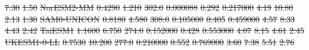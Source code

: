 \documentclass[gmd, manuscript]{copernicus}
\providecommand{\DIFdel}[1]{{\protect\color{red}\sout{#1}}}                      %
\providecommand{\DIFdelFL}[1]{\DIFdel{#1}} %
\providecommand{\DIFaddbeginFL}{} %
\providecommand{\DIFaddendFL}{} %
\providecommand{\DIFdelbeginFL}{} %
\providecommand{\DIFdelendFL}{} %
\begin{document}
\begin{table}[t]
{\DIFdelFL{7.30 }%
\DIFdelFL{1.50 }%
\DIFdelFL{NorESM2-MM      }%
\DIFdelFL{0.4290 }%
\DIFdelFL{1.210 }%
\DIFdelFL{302.0 }%
\DIFdelFL{0.000088 }%
\DIFdelFL{0.292 }%
\DIFdelFL{0.217000 }%
\DIFdelFL{4.19 }%
\DIFdelFL{10.80 }%
\DIFdelFL{2.13 }%
\DIFdelFL{1.30 }%
\DIFdelFL{SAM0-UNICON     }%
\DIFdelFL{0.8180 }%
\DIFdelFL{4.580 }%
\DIFdelFL{308.0 }%
\DIFdelFL{0.105000 }%
\DIFdelFL{0.405 }%
\DIFdelFL{0.459000 }%
\DIFdelFL{4.57 }%
\DIFdelFL{8.33 }%
\DIFdelFL{4.43 }%
\DIFdelFL{2.42 }%
\DIFdelFL{TaiESM1         }%
\DIFdelFL{1.1600 }%
\DIFdelFL{6.750 }%
\DIFdelFL{274.0 }%
\DIFdelFL{0.152000 }%
\DIFdelFL{0.428 }%
\DIFdelFL{0.553000 }%
\DIFdelFL{4.07 }%
\DIFdelFL{8.15 }%
\DIFdelFL{4.61 }%
\DIFdelFL{2.45 }%
\DIFdelFL{UKESM1-0-LL     }%
\DIFdelFL{0.7530 }%
\DIFdelFL{10.200 }%
\DIFdelFL{277.0 }%
\DIFdelFL{0.210000 }%
\DIFdelFL{0.552 }%
\DIFdelFL{0.769000 }%
\DIFdelFL{3.60 }%
\DIFdelFL{7.38 }%
\DIFdelFL{5.51 }%
\DIFdelFL{2.76 }%
\DIFdelendFL \DIFaddbeginFL \footnotesize
    
    \DIFaddendFL }
\DIFdelbeginFL %
\DIFdelendFL \DIFaddbeginFL \end{table}
\clearpage
\end{document}
